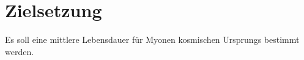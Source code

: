 
\section{Zielsetzung}
\label{sec:Zielsetzung}
Es soll eine mittlere Lebensdauer für Myonen kosmischen Ursprungs bestimmt werden.
